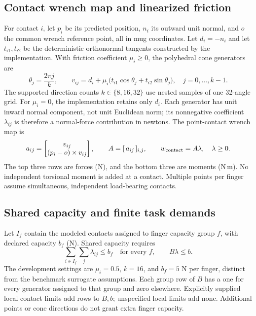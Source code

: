 \documentclass{article}
\begin{document}
\subsection{Contact wrench map and linearized friction}
For contact $i$, let $p_i$ be its predicted position, $n_i$ its outward unit normal, and $o$ the common wrench reference point, all in mug coordinates. Let $d_i=-n_i$ and let $t_{i1},t_{i2}$ be the deterministic orthonormal tangents constructed by the implementation. With friction coefficient $\mu_i\ge0$, the polyhedral cone generators are
\begin{equation}
\theta_j=\frac{2\pi j}{k},\qquad
v_{ij}=d_i+\mu_i\bigl(t_{i1}\cos\theta_j+t_{i2}\sin\theta_j\bigr),
\quad j=0,\ldots,k-1.
\label{eq:cone}
\end{equation}
The supported direction counts $k\in\{8,16,32\}$ use nested samples of one 32-angle grid. For $\mu_i=0$, the implementation retains only $d_i$. Each generator has unit inward normal component, not unit Euclidean norm; its nonnegative coefficient $\lambda_{ij}$ is therefore a normal-force contribution in newtons. The point-contact wrench map is
\begin{equation}
  a_{ij}=\begin{bmatrix}v_{ij}\\(p_i-o)\times v_{ij}\end{bmatrix},\qquad
 A=[\,a_{ij}\,]_{i,j},\qquad w_{\rm contact}=A\lambda,\quad\lambda\ge0.
\label{eq:wrench-map}
\end{equation}
The top three rows are forces (N), and the bottom three are moments (N\,m). No independent torsional moment is added at a contact. Multiple points per finger assume simultaneous, independent load-bearing contacts.

\subsection{Shared capacity and finite task demands}
Let $I_f$ contain the modeled contacts assigned to finger capacity group $f$, with declared capacity $b_f$ (N). Shared capacity requires
\begin{equation}
 \sum_{i\in I_f}\sum_j\lambda_{ij}\le b_f\quad\text{for every }f,
 \qquad B\lambda\le b.
\label{eq:capacity}
\end{equation}
The development settings are $\mu_i=0.5$, $k=16$, and $b_f=5$ N per finger, distinct from the benchmark surrogate assumptions. Each group row of $B$ has a one for every generator assigned to that group and zero elsewhere. Explicitly supplied local contact limits add rows to $B,b$; unspecified local limits add none. Additional points or cone directions do not grant extra finger capacity.
\end{document}
